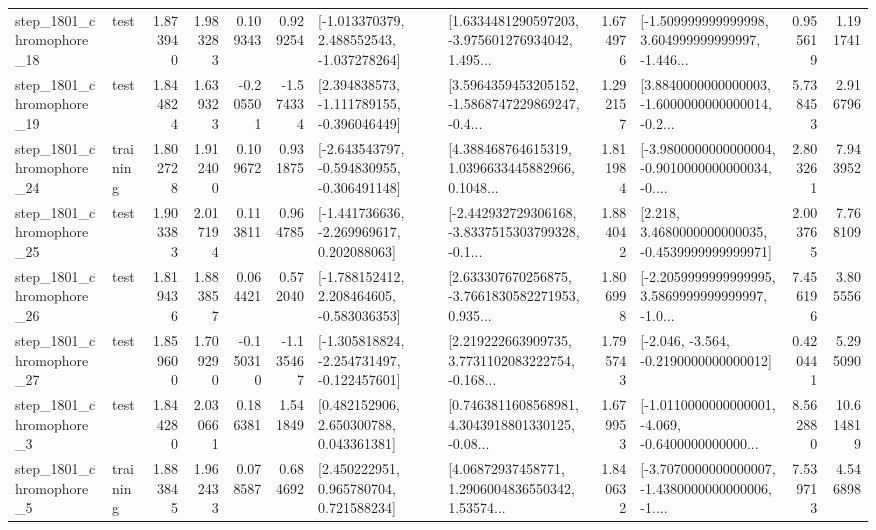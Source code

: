 \begin{tabular}{llrrrrllrlrr}
 step\_1801\_chromophore\_18 &      test &      1.873940 &    1.983283 &      0.109343 &  0.929254 &   [-1.013370379, 2.488552543, -1.037278264] &  [1.6334481290597203, -3.975601276934042, 1.495... &       1.674976 &  [-1.509999999999998, 3.604999999999997, -1.446... &            0.955619 &          1.191741 \\
 step\_1801\_chromophore\_19 &      test &      1.844824 &    1.639323 &     -0.205501 & -1.574334 &   [2.394838573, -1.111789155, -0.396046449] &  [3.5964359453205152, -1.5868747229869247, -0.4... &       1.292157 &  [3.8840000000000003, -1.6000000000000014, -0.2... &            5.738453 &          2.916796 \\
 step\_1801\_chromophore\_24 &  training &      1.802728 &    1.912400 &      0.109672 &  0.931875 &  [-2.643543797, -0.594830955, -0.306491148] &  [4.388468764615319, 1.0396633445882966, 0.1048... &       1.811984 &  [-3.9800000000000004, -0.9010000000000034, -0.... &            2.803261 &          7.943952 \\
 step\_1801\_chromophore\_25 &      test &      1.903383 &    2.017194 &      0.113811 &  0.964785 &   [-1.441736636, -2.269969617, 0.202088063] &  [-2.442932729306168, -3.8337515303799328, -0.1... &       1.884042 &   [2.218, 3.4680000000000035, -0.4539999999999971] &            2.003765 &          7.768109 \\
 step\_1801\_chromophore\_26 &      test &      1.819436 &    1.883857 &      0.064421 &  0.572040 &   [-1.788152412, 2.208464605, -0.583036353] &  [2.633307670256875, -3.7661830582271953, 0.935... &       1.806998 &  [-2.2059999999999995, 3.5869999999999997, -1.0... &            7.456196 &          3.805556 \\
 step\_1801\_chromophore\_27 &      test &      1.859600 &    1.709290 &     -0.150310 & -1.135467 &  [-1.305818824, -2.254731497, -0.122457601] &  [2.219222663909735, 3.7731102083222754, -0.168... &       1.795743 &              [-2.046, -3.564, -0.2190000000000012] &            0.420441 &          5.295090 \\
  step\_1801\_chromophore\_3 &      test &      1.844280 &    2.030661 &      0.186381 &  1.541849 &     [0.482152906, 2.650300788, 0.043361381] &  [0.7463811608568981, 4.3043918801330125, -0.08... &       1.679953 &  [-1.0110000000000001, -4.069, -0.6400000000000... &            8.562880 &         10.614819 \\
  step\_1801\_chromophore\_5 &  training &      1.883845 &    1.962433 &      0.078587 &  0.684692 &     [2.450222951, 0.965780704, 0.721588234] &  [4.06872937458771, 1.2906004836550342, 1.53574... &       1.840632 &  [-3.7070000000000007, -1.4380000000000006, -1.... &            7.539713 &          4.546898 \\

\end{tabular}
